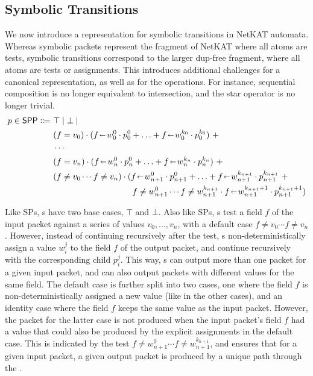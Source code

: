 \documentclass[acmsmall,dvipsnames,nonacm]{acmart}
\begin{document}
\subsection{Symbolic Transitions}\label{sec:symtrans}

We now introduce a representation for symbolic transitions in NetKAT
automata.  Whereas symbolic packets represent the fragment of NetKAT
where all atoms are tests, symbolic transitions correspond to the
larger dup-free fragment, where all atoms are tests or
assignments. This introduces additional challenges for a canonical
representation, as well as for the operations. For instance,
sequential composition is no longer equivalent to intersection, and
the star operator is no longer trivial.
\begin{align*}
    p \in \SPP \Coloneqq\ &\top \mid \bot \mid\\
    & (f = v_0) \cdot (f \mut w_{0}^{0} \cdot p_{0}^{0} + \ldots + f \mut w_{0}^{k_0} \cdot p_{0}^{k_0})\ + \\
    & \cdots \\
    & (f = v_n) \cdot (f \mut w_{n}^{0} \cdot p_{n}^{0} + \ldots + f \mut w_{n}^{k_n} \cdot p_{n}^{k_n})\ + \\
    & (f \neq v_0 \cdots f \neq v_n) \cdot (f \mut w_{n+1}^{0} \cdot p_{n+1}^{0} + \ldots + f \mut w_{n+1}^{k_{n+1}} \cdot p_{n+1}^{k_{n+1}}\ + \\
    & \phantom{(f \neq v_0 \cdots f \neq v_n) \cdot\ \ \ } f \neq w_{n+1}^{0} \cdots f \neq w_{n+1}^{k_{n+1}} \cdot f \mut w_{n+1}^{k_{n+1}+1} \cdot p_{n+1}^{k_{n+1}+1})
\end{align*}

Like SPs, \SPPn{}s have two base cases, $\top$ and $\bot$.
Also like SPs, \SPPn{}s test a field $f$ of the input packet against a series of values $v_0,\dots,v_n$, with a default case $f \neq v_0 \cdots f \neq v_n$.
However, instead of continuing recursively after the test, \SPPn{}s non-deterministically assign a value $w_i^j$ to the field $f$ of the output packet, and continue recursively with the corresponding child $p_i^j$.
This way, \SPPn{}s can output more than one packet for a given input packet, and can also output packets with different values for the same field.
The default case is further split into two cases, one where the field $f$ is non-deterministically assigned a new value (like in the other cases), and an identity case where the field $f$ keeps the same value as the input packet.
However, the packet for the latter case is not produced when the input packet's field $f$ had a value that could also be produced by the explicit assignments in the default case.
This is indicated by the test $f \neq w_{n+1}^{0} \cdots f \neq w_{n+1}^{k_{n+1}}$, and ensures that for a given input packet, a given output packet is produced by a unique path through the \SPPn{}.
\end{document}
